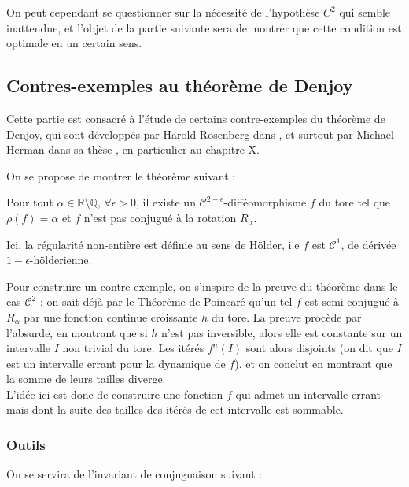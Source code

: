 \documentclass[11pt,a4paper]{article}
\begin{document}
On peut cependant se questionner sur la nécessité de l'hypothèse $C^2$ qui semble inattendue, et l'objet de la partie suivante sera de montrer que cette condition est optimale en un certain sens.


\subsection{Contres-exemples au théorème de Denjoy}
Cette partie est consacré à l'étude de certains contre-exemples du théorème de Denjoy, qui sont développés par Harold Rosenberg dans \cite{rosenberg}, et surtout par Michael Herman dans sa thèse \cite{herman}, en particulier au chapitre X. 

On se propose de montrer le théorème suivant :

\begin{thm}[Denjoy]\label{cex_denjoy}
Pour tout $\alpha \in \mathbb{R} \setminus \mathbb{Q}$, $\forall \epsilon > 0$, il existe un $\mathcal{C}^{2-\epsilon}$-difféomorphisme $f$ du tore tel que $\rho(f)=\alpha$ et $f$ n'est pas conjugué à la rotation $R_\alpha$.
\end{thm}

\begin{rmq}
Ici, la  régularité non-entière est définie au sens de Hölder, i.e $f$ est $\mathcal{C}^1$, de dérivée $1-\epsilon$-hölderienne.
\end{rmq}

Pour construire un contre-exemple, on s'inspire de la preuve du théorème dans le cas $\mathcal{C}^2$ : on sait déjà par le \hyperref[poincare]{Théorème de Poincaré} qu'un tel $f$ est semi-conjugué à $R_\alpha$ par une fonction continue croissante $h$ du tore. La preuve procède par l'absurde, en montrant que si $h$ n'est pas inversible, alors elle est constante sur un intervalle $I$ non trivial du tore. Les itérés $f^n(I)$ sont alors disjoints (on dit que $I$ est un intervalle errant pour la dynamique de $f$), et on conclut en montrant que la somme de leurs tailles diverge. \\ 
L'idée ici est donc de construire une fonction $f$ qui admet un intervalle errant mais dont la suite des tailles des itérés de cet intervalle est sommable. 

\subsubsection{Outils}

On se servira de l'invariant de conjuguaison suivant : 
\end{document}

